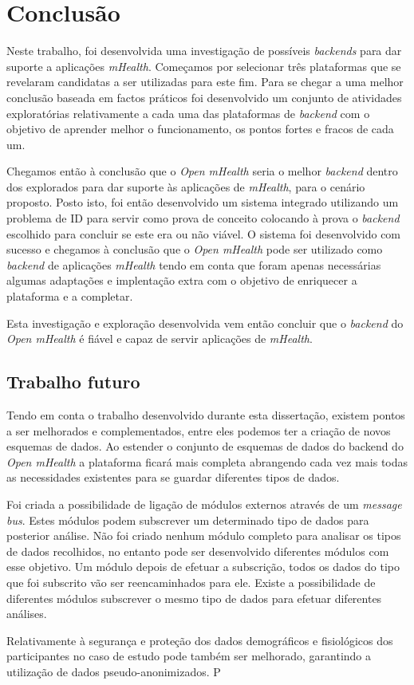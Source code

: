 \chapter{Conclusão}

Neste trabalho, foi desenvolvida uma investigação de possíveis \textit{backends} para dar suporte a aplicações \textit{mHealth}. 
Começamos por selecionar três plataformas que se revelaram candidatas a ser utilizadas para este fim. Para se chegar a uma melhor conclusão baseada em factos práticos foi desenvolvido um conjunto de atividades exploratórias relativamente a cada uma das plataformas de \textit{backend} com o objetivo de aprender melhor o funcionamento, os pontos fortes e fracos de cada um. \par 
Chegamos então à conclusão que o \textit{Open mHealth} seria o melhor \textit{backend} dentro dos explorados para dar suporte às aplicações de \textit{mHealth}, para o cenário proposto.
Posto isto, foi então desenvolvido um sistema integrado utilizando um problema de \gls{ID} para servir como prova de conceito colocando à prova o \textit{backend} escolhido para concluir se este era ou não viável.
O sistema foi desenvolvido com sucesso e chegamos à conclusão que o \textit{Open mHealth} pode ser utilizado como \textit{backend} de aplicações \textit{mHealth} tendo em conta que foram apenas necessárias algumas adaptações e implentação extra com o objetivo de enriquecer a plataforma e a completar. \par
Esta investigação e exploração desenvolvida vem então concluir que o \textit{backend} do \textit{Open mHealth} é fiável e capaz de servir aplicações de \textit{mHealth}.


\section{Trabalho futuro}
Tendo em conta o trabalho desenvolvido durante esta dissertação, existem pontos a ser melhorados e complementados, entre eles podemos ter a criação de novos esquemas de dados. Ao estender o conjunto de esquemas de dados do backend do \textit{Open mHealth} a plataforma ficará mais completa abrangendo cada vez mais todas as necessidades existentes para se guardar diferentes tipos de dados.\par
Foi criada a possibilidade de ligação de módulos externos através de um \textit{message bus}. Estes módulos podem subscrever um determinado tipo de dados para posterior análise. Não foi criado nenhum módulo completo para analisar os tipos de dados recolhidos, no entanto pode ser desenvolvido diferentes módulos com esse objetivo. Um módulo depois de efetuar a subscrição, todos os dados do tipo que foi subscrito vão ser reencaminhados para ele. Existe a possibilidade de diferentes módulos subscrever o mesmo tipo de dados para efetuar diferentes análises.\par
Relativamente à segurança e proteção dos dados demográficos e fisiológicos dos participantes no caso de estudo pode também ser melhorado, garantindo a utilização de dados pseudo-anonimizados.
P

\cleardoublepage